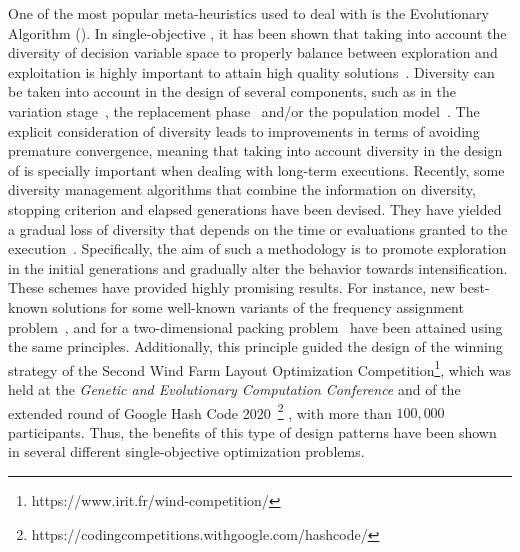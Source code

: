 One of the most popular meta-heuristics used to deal with \MOPS{} is the Evolutionary Algorithm (\EA{}).
%
In single-objective \EAS{}, it has been shown that taking into account the diversity of decision variable space
to properly balance between exploration and exploitation is highly important to attain high quality 
solutions~\citep{Joel:BALANCE_DIVERSITY}.
%
Diversity can be taken into account in the design of several components, such as in the variation 
stage~\citep{Joel:FUZZY_ADAPTIVE_GA,Joel:CROSSOVER_DIVERSITY}, the replacement phase~\citep{Joel:MULTI_DYNAMIC} 
and/or the population model~\citep{Joel:SAWTOOTH}.
%
The explicit consideration of diversity leads to improvements in terms of avoiding premature convergence, 
meaning that taking into account diversity in the design of \EAS{} is specially important when dealing 
with long-term executions.
%
Recently, some diversity management algorithms that combine the information on diversity, stopping criterion and elapsed 
generations have been devised.
%
They have yielded a gradual loss of diversity that depends on the time or evaluations granted to the 
execution~\citep{Joel:MULTI_DYNAMIC}.
%
Specifically, the aim of such a methodology is to promote exploration in the initial generations and gradually alter the 
behavior towards intensification.
%
These schemes have provided highly promising results.
%
For instance, new best-known solutions for some well-known variants of the frequency assignment problem~\citep{Segura:17},
and for a two-dimensional packing problem~\citep{Joel:MULTI_DYNAMIC} have been attained using the same principles.
%
Additionally, this principle guided the design of the winning strategy of the Second Wind Farm Layout Optimization 
Competition\footnote{https://www.irit.fr/wind-competition/}, which was held at the {\em Genetic and Evolutionary 
Computation Conference} and of the extended round of Google Hash Code 2020~\footnote{https://codingcompetitions.withgoogle.com/hashcode/}
, with more than $100,000$ participants.
%
Thus, the benefits of this type of design patterns have been shown in several different single-objective optimization problems.

